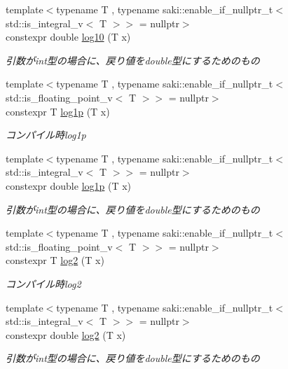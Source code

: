 \begin{DoxyCompactItemize}
{\footnotesize template$<$typename T , typename saki\+::enable\+\_\+if\+\_\+nullptr\+\_\+t$<$ std\+::is\+\_\+integral\+\_\+v$<$ T $>$$>$  = nullptr$>$ }\\constexpr double \mbox{\hyperlink{namespacesaki_a7e5fde452567de6eaae1d5c481497757}{log10}} (T x)
\begin{DoxyCompactList}\small\item\em 引数がint型の場合に、戻り値をdouble型にするためのもの \end{DoxyCompactList}\item 
{\footnotesize template$<$typename T , typename saki\+::enable\+\_\+if\+\_\+nullptr\+\_\+t$<$ std\+::is\+\_\+floating\+\_\+point\+\_\+v$<$ T $>$$>$  = nullptr$>$ }\\constexpr T \mbox{\hyperlink{namespacesaki_ae0b2550b674acc69fa1fbe407917fdc7}{log1p}} (T x)
\begin{DoxyCompactList}\small\item\em コンパイル時log1p \end{DoxyCompactList}\item 
{\footnotesize template$<$typename T , typename saki\+::enable\+\_\+if\+\_\+nullptr\+\_\+t$<$ std\+::is\+\_\+integral\+\_\+v$<$ T $>$$>$  = nullptr$>$ }\\constexpr double \mbox{\hyperlink{namespacesaki_aec755aa143bd9a0d03c5ebb2dc5dd3de}{log1p}} (T x)
\begin{DoxyCompactList}\small\item\em 引数がint型の場合に、戻り値をdouble型にするためのもの \end{DoxyCompactList}\item 
{\footnotesize template$<$typename T , typename saki\+::enable\+\_\+if\+\_\+nullptr\+\_\+t$<$ std\+::is\+\_\+floating\+\_\+point\+\_\+v$<$ T $>$$>$  = nullptr$>$ }\\constexpr T \mbox{\hyperlink{namespacesaki_ac184cde6c3531e01531219e081e25452}{log2}} (T x)
\begin{DoxyCompactList}\small\item\em コンパイル時log2 \end{DoxyCompactList}\item 
{\footnotesize template$<$typename T , typename saki\+::enable\+\_\+if\+\_\+nullptr\+\_\+t$<$ std\+::is\+\_\+integral\+\_\+v$<$ T $>$$>$  = nullptr$>$ }\\constexpr double \mbox{\hyperlink{namespacesaki_a8cb2f664389aab32abc797d9a60db4dc}{log2}} (T x)
\begin{DoxyCompactList}\small\item\em 引数がint型の場合に、戻り値をdouble型にするためのもの \end{DoxyCompactList}\item 

\end{DoxyCompactItemize}
